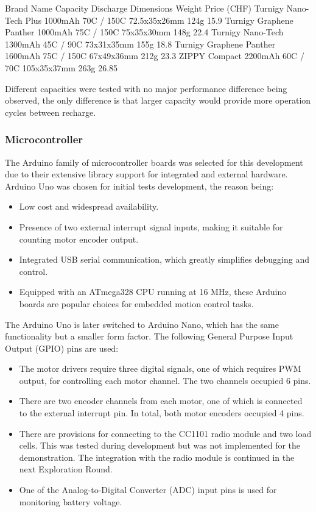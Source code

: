 Brand Name
Capacity
Discharge 
Dimensions
Weight
Price (CHF)
Turnigy Nano-Tech Plus
1000mAh
70C / 150C
72.5x35x26mm
124g
15.9
Turnigy Graphene Panther 
1000mAh
75C / 150C
75x35x30mm
148g
22.4
Turnigy Nano-Tech
1300mAh
45C / 90C
73x31x35mm
155g
18.8
Turnigy Graphene Panther 
1600mAh
75C / 150C
 67x49x36mm
212g
23.3
ZIPPY Compact 
2200mAh
60C / 70C
105x35x37mm
263g
26.85

Different capacities were tested with no major performance difference being observed, the only difference is that larger capacity would provide more operation cycles between recharge.

\subsubsection{Microcontroller}
The Arduino family of microcontroller boards was selected for this development due to their extensive library support for integrated and external hardware. 
Arduino Uno was chosen for initial tests development, the reason being:
\begin{itemize}
    \item Low cost and widespread availability.
    \item Presence of two external interrupt signal inputs, making it suitable for counting motor encoder output. 
    \item Integrated USB serial communication, which greatly simplifies debugging and control.
    \item Equipped with an ATmega328 CPU running at 16 MHz, these Arduino boards are popular choices for embedded motion control tasks.
\end{itemize}

The Arduino Uno is later switched to Arduino Nano, which has the same functionality but a smaller form factor. The following General Purpose Input Output (GPIO) pins are used:
\begin{itemize}
    \item The motor drivers require three digital signals, one of which requires PWM output, for controlling each motor channel. The two channels occupied 6 pins. 
    \item There are two encoder channels from each motor, one of which is connected to the external interrupt pin. In total, both motor encoders occupied 4 pins.
    \item There are provisions for connecting to the CC1101 radio module and two load cells. This was tested during development but was not implemented for the demonstration. The integration with the radio module is continued in the next Exploration Round.
    \item One of the Analog-to-Digital Converter (ADC) input pins is used for monitoring battery voltage.
\end{itemize}

